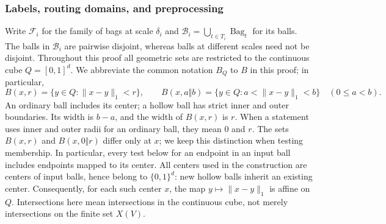 \subsubsection{Labels, routing domains, and preprocessing}
\label{ha:preprocessing}

Write $\mathcal F_i$ for the family of bags at scale $\delta_i$ and
$\mathcal B_i=\bigcup_{t\in T_i}\operatorname{Bag}_t$ for its balls.
The balls in $\mathcal B_i$ are pairwise disjoint, whereas balls at
different scales need not be disjoint.  Throughout this proof all
geometric sets are restricted to the continuous cube $Q=[0,1]^d$.
We abbreviate the common notation $B_Q$ to $B$ in this proof; in particular,
\[
 B(x,r)=\{y\in Q:\|x-y\|_1<r\},\qquad
 B(x,a\Vert b)=\{y\in Q:a<\|x-y\|_1<b\}
 \quad(0\le a<b).
\]
An ordinary ball includes its center; a hollow ball has strict inner
and outer boundaries.  Its width is $b-a$, and the width of $B(x,r)$
is $r$.  When a statement uses inner and outer radii for an ordinary
ball, they mean $0$ and $r$.  The sets $B(x,r)$ and
$B(x,0\Vert r)$ differ only at $x$; we keep this distinction when
testing membership.  In particular, every test below for an endpoint
in an input ball includes endpoints mapped to its center.
All centers used in the construction are centers of input balls, hence
belong to $\{0,1\}^d$: new hollow balls inherit an existing center.
Consequently, for each such center $x$, the map $y\mapsto\|x-y\|_1$
is affine on $Q$.  Intersections here mean intersections in the
continuous cube, not merely intersections on the finite set $X(V)$.

